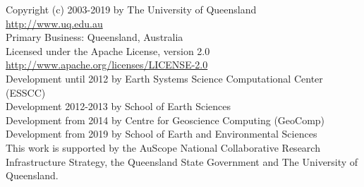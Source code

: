 
%
%
%

\begin{center}
Copyright (c) 2003-2019 by The University of Queensland\\
\url{http://www.uq.edu.au}\\
Primary Business: Queensland, Australia\\
Licensed under the Apache License, version 2.0\\
\url{http://www.apache.org/licenses/LICENSE-2.0}\\
Development until 2012 by Earth Systems Science Computational Center (ESSCC)\\
Development 2012-2013 by School of Earth Sciences\\
Development from 2014 by Centre for Geoscience Computing (GeoComp)\\
Development from 2019 by School of Earth and Environmental Sciences\\

This work is supported by the AuScope National Collaborative Research
Infrastructure Strategy, the Queensland State Government and The University
of Queensland.
\end{center}

